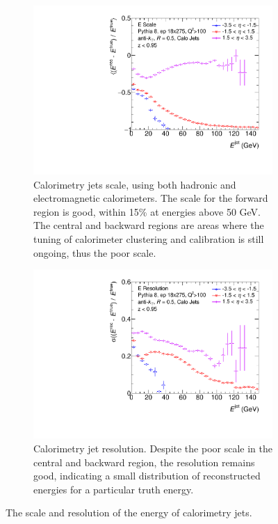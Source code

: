 \begin{figure}
    \centering
    \begin{subfigure}{0.4\textwidth}
        \centering
        \includegraphics[width=\linewidth]{figs/Final_Plots/JES_calo_grouped.pdf}
        \caption{Calorimetry jets scale, using both hadronic and electromagnetic calorimeters.  The scale for the forward region is good, within 15\% at energies above 50 GeV.  The central and backward regions are areas where the tuning of calorimeter clustering and calibration is still ongoing, thus the poor scale.}
        \label{fig:calo_energy_scale}
    \end{subfigure}
    \hfill
    \begin{subfigure}{0.4\textwidth}
        \centering
        \includegraphics[width=\linewidth]{figs/Final_Plots/JER_E_calo_grouped.pdf}
        \caption{Calorimetry jet resolution.  Despite the poor scale in the central and backward region, the resolution remains good, indicating a small distribution of reconstructed energies for a particular truth energy.}
        \label{fig:calo_energy_resolution}
    \end{subfigure}
    \caption{The scale and resolution of the energy of calorimetry jets.}
    \label{fig:calo_energy_reso_scale}
\end{figure}



